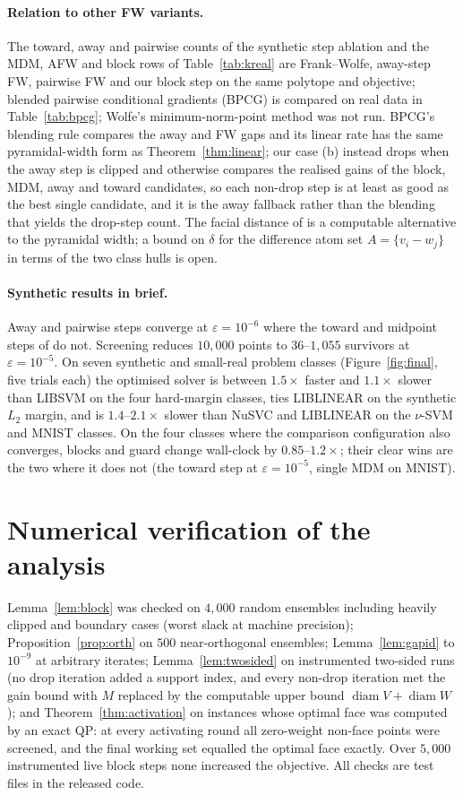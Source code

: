 \documentclass{opt2026}   %
\begin{document}
\paragraph{Relation to other FW variants.} The toward, away and pairwise counts of the synthetic step ablation and
the MDM, AFW and block rows of Table~\ref{tab:kreal} are Frank--Wolfe,
away-step FW, pairwise FW and our block step on the same
polytope and objective; blended pairwise conditional gradients (BPCG)
\cite{tsuji2022} is compared on real data in Table~\ref{tab:bpcg};
Wolfe's minimum-norm-point method \cite{wolfe1976} was not run. BPCG's
blending rule compares the away
and FW gaps and its linear rate has the same pyramidal-width form as
Theorem~\ref{thm:linear}; our case (b) instead drops when the away step is clipped and
otherwise compares the realised gains of the block, MDM, away and
toward candidates, so each non-drop step is at least as good as the
best single candidate, and it is the away
fallback rather than the blending that yields the drop-step count. The
facial distance of \cite{pena2019} is a computable alternative to the
pyramidal width; a bound on $\delta$ for the difference atom set
$A=\{v_i-w_j\}$ in terms of the two class hulls is open.
\paragraph{Synthetic results in brief.} Away and pairwise steps
converge at $\varepsilon=10^{-6}$ where the toward and midpoint steps of
\cite{gupta2026} do not. Screening reduces $10{,}000$ points to
$36$--$1{,}055$ survivors at $\varepsilon=10^{-5}$. On seven synthetic
and small-real problem classes (Figure~\ref{fig:final}, five trials
each) the optimised solver is between $1.5\times$ faster and $1.1\times$
slower than LIBSVM on the four hard-margin classes, ties LIBLINEAR on
the synthetic $L_2$ margin, and is $1.4$--$2.1\times$ slower than NuSVC
and LIBLINEAR on the $\nu$-SVM and MNIST classes. On the four classes
where the comparison configuration also converges, blocks and guard
change wall-clock by $0.85$--$1.2\times$; their clear wins are the two
where it does not (the toward step at $\varepsilon=10^{-5}$, single MDM
on MNIST).

\section{Numerical verification of the analysis}\label{app:num}
Lemma~\ref{lem:block} was checked on $4{,}000$ random ensembles
including heavily clipped and boundary cases (worst slack at machine
precision); Proposition~\ref{prop:orth} on $500$ near-orthogonal
ensembles; Lemma~\ref{lem:gapid} to $10^{-9}$ at arbitrary iterates;
Lemma~\ref{lem:twosided} on instrumented two-sided runs (no drop
iteration added a support index, and every non-drop iteration met the
gain bound with $M$ replaced by the computable upper bound
$\operatorname{diam}V+\operatorname{diam}W$); and Theorem~\ref{thm:activation} on instances whose optimal
face was computed by an exact QP: at every activating round all
zero-weight non-face points were screened, and the final working set
equalled the optimal face exactly. Over $5{,}000$ instrumented live
block steps none increased the objective. All checks are test files in
the released code.
\end{document}
